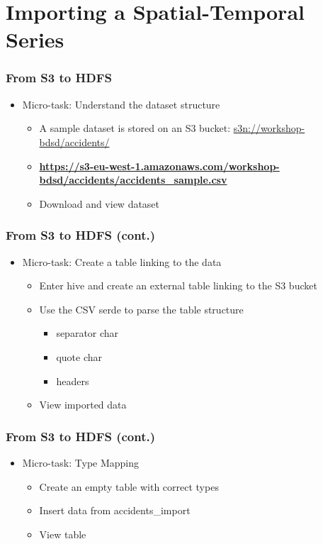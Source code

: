 \documentclass[hyperref={pdfpagelabels=true}]{beamer}
\begin{document}
\section{Importing a Spatial-Temporal Series} 

\begin{frame}
\frametitle{From S3 to HDFS}
\begin{itemize}
  \item<1->Micro-task: Understand the dataset structure
  \begin{itemize}
    \item<1->A sample dataset is stored on an S3 bucket: \url{s3n://workshop-bdsd/accidents/}
    \item<2->\textbf{\url{https://s3-eu-west-1.amazonaws.com/workshop-bdsd/accidents/accidents\_sample.csv}}
    \item<3->Download and view dataset
  \end{itemize}
\end{itemize}
\end{frame}

\begin{frame}
\frametitle{From S3 to HDFS (cont.)}
\begin{itemize}
  \item<1->Micro-task: Create a table linking to the data
  \begin{itemize}
    \item<1->Enter hive and create an external table linking to the S3 bucket
    \item<2->Use the CSV serde to parse the table structure
      \begin{itemize}
	\item<3->separator char
	\item<3->quote char
	\item<3->headers
       \end{itemize}
    \item<4->View imported data       
  \end{itemize}
\end{itemize}
\end{frame}

\begin{frame}
\frametitle{From S3 to HDFS (cont.)}
\begin{itemize}
  \item<1->Micro-task: Type Mapping
  \begin{itemize}
    \item<2->Create an empty table with correct types
    \item<3->Insert data from accidents\_import
    \item<4->View table
  \end{itemize}
\end{itemize}
\end{frame}
\end{document}
